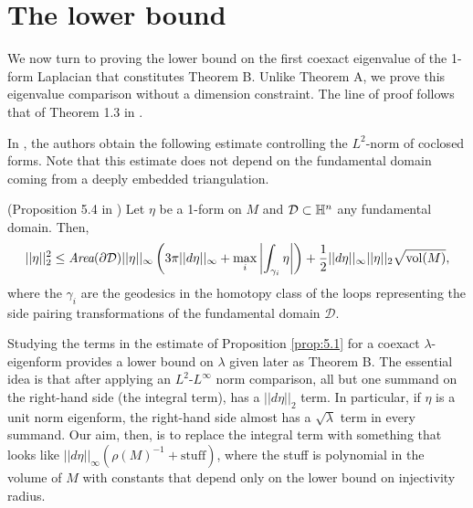 

\section{The lower bound}
\label{sec:5}

We now turn to proving the lower bound on the first coexact eigenvalue of the 1-form Laplacian that constitutes Theorem B. Unlike Theorem A, we prove this eigenvalue comparison without a dimension constraint. The line of proof follows that of Theorem 1.3 in \cite{LS}.

In \cite{LS}, the authors obtain the following estimate controlling the $L^2$-norm of coclosed forms.  Note that this estimate does not depend on the fundamental domain coming from a deeply embedded triangulation.

\begin{prop} \label{prop:5.1} (Proposition 5.4 in \cite{LS})
Let $\eta$ be a 1-form on $M$ and $\mathcal D\subset \mathbb H^n$ any fundamental domain. Then,
$$||\eta||_2^2 \leq \emph{Area}(\partial \mathcal D)||\eta||_{\infty}\left(3\pi||d\eta||_{\infty} + \max_i\left|\int_{\gamma_i}\eta\right|\right) + \frac{1}{2}||d\eta||_{\infty}||\eta||_2\sqrt{\operatorname{vol}(M)},$$
where the $\gamma_i$ are the geodesics in the homotopy class of the loops representing the side pairing transformations of the fundamental domain $\mathcal D$.
\end{prop}


Studying the terms in the estimate of Proposition \ref{prop:5.1} for a coexact $\lambda$-eigenform provides a lower bound on $\lambda$ given later as Theorem B. The essential idea is that after applying an $L^2$-$L^{\infty}$ norm comparison, all but one summand on the right-hand side (the integral term), has a $||d\eta||_2$ term. In particular, if $\eta$ is a unit norm eigenform, the right-hand side almost has a $\sqrt{\lambda}$ term in every summand. Our aim, then, is to replace the integral term with something that looks like $||d\eta||_{\infty} (\rho(M)^{-1}+\text{stuff})$, where the stuff is polynomial in the volume of $M$ with constants that depend only on the lower bound on injectivity radius.

